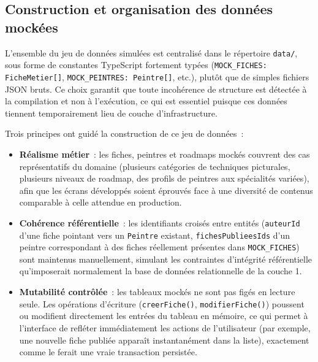 \documentclass[12pt,a4paper]{report}
\begin{document}
\subsection{Construction et organisation des données mockées}

L'ensemble du jeu de données simulées est centralisé dans le répertoire \texttt{data/}, sous forme de constantes TypeScript fortement typées (\texttt{MOCK\_FICHES: FicheMetier[]}, \texttt{MOCK\_PEINTRES: Peintre[]}, etc.), plutôt que de simples fichiers JSON bruts. Ce choix garantit que toute incohérence de structure est détectée à la compilation et non à l'exécution, ce qui est essentiel puisque ces données tiennent temporairement lieu de couche d'infrastructure.

Trois principes ont guidé la construction de ce jeu de données~:

\begin{itemize}
    \item \textbf{Réalisme métier}~: les fiches, peintres et roadmaps mockés couvrent des cas représentatifs du domaine (plusieurs catégories de techniques picturales, plusieurs niveaux de roadmap, des profils de peintres aux spécialités variées), afin que les écrans développés soient éprouvés face à une diversité de contenus comparable à celle attendue en production.

    \item \textbf{Cohérence référentielle}~: les identifiants croisés entre entités (\texttt{auteurId} d'une fiche pointant vers un \texttt{Peintre} existant, \texttt{fichesPublieesIds} d'un peintre correspondant à des fiches réellement présentes dans \texttt{MOCK\_FICHES}) sont maintenus manuellement, simulant les contraintes d'intégrité référentielle qu'imposerait normalement la base de données relationnelle de la couche 1.

    \item \textbf{Mutabilité contrôlée}~: les tableaux mockés ne sont pas figés en lecture seule. Les opérations d'écriture (\texttt{creerFiche()}, \texttt{modifierFiche()}) poussent ou modifient directement les entrées du tableau en mémoire, ce qui permet à l'interface de refléter immédiatement les actions de l'utilisateur (par exemple, une nouvelle fiche publiée apparaît instantanément dans la liste), exactement comme le ferait une vraie transaction persistée.
\end{itemize}
\end{document}
